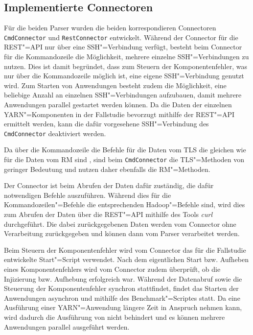 \subsection{Implementierte Connectoren}
\label{subsec:implementedConnectors}

Für die beiden Parser wurden die beiden korrespondieren Connectoren \texttt{CmdConnector} und \texttt{RestConnector} entwickelt.
Während der Connector für die REST"=API nur über eine SSH"=Verbindung verfügt, besteht beim Connector für die Kommandozeile die Möglichkeit, mehrere einzelne SSH"=Verbindungen zu nutzen.
Dies ist damit begründet, dass zum Steuern der Komponentenfehler, was nur über die Kommandozeile möglich ist, eine eigene SSH"=Verbindung genutzt wird.
Zum Starten von Anwendungen besteht zudem die Möglichkeit, eine beliebige Anzahl an einzelnen SSH"=Verbindungen aufzubauen, damit mehrere Anwendungen parallel gestartet werden können.
Da die Daten der einzelnen YARN"=Komponenten in der Fallstudie bevorzugt mithilfe der REST"=API ermittelt werden, kann die dafür vorgesehene SSH"=Verbindung des \texttt{CmdConnector} deaktiviert werden.

Da über die Kommandozeile die Befehle für die Daten vom \ac{TLS} die gleichen wie für die Daten vom \ac{RM} sind \cite{HadoopYarnTlServer271,HadoopYarnCmds271}, sind beim \texttt{CmdConnector} die \ac{TLS}"=Methoden von geringer Bedeutung und nutzen daher ebenfalls die \ac{RM}"=Methoden.

Der Connector ist beim Abrufen der Daten dafür zuständig, die dafür notwendigen Befehle auszuführen.
Während dies für die Kommandozeilen"=Befehle die entsprechenden Hadoop"=Befehle sind, wird dies zum Abrufen der Daten über die REST"=API mithilfe des Tools \emph{curl} durchgeführt.
Die dabei zurückgegebenen Daten werden vom Connector ohne Verarbeitung zurückgegeben und können dann vom Parser verarbeitet werden.

Beim Steuern der Komponentenfehler wird vom Connector das für die Fallstudie entwickelte Start"=Script verwendet.
Nach dem eigentlichen Start bzw. Aufheben eines Komponentenfehlers wird vom Connector zudem überprüft, ob die Injizierung bzw. Aufhebung erfolgreich war.
Während der Datenabruf sowie die Steuerung der Komponentenfehler synchron stattfindet, findet das Starten der Anwendungen asynchron und mithilfe des Benchmark"=Scriptes statt.
Da eine Ausführung einer YARN"=Anwendung längere Zeit in Anspruch nehmen kann, wird dadurch die Ausführung von \sS nicht behindert und es können mehrere Anwendungen parallel ausgeführt werden.

